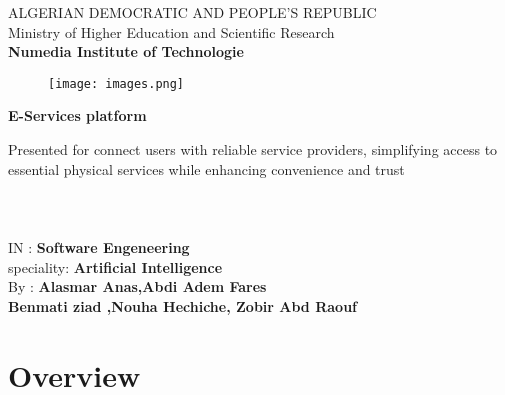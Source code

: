 \documentclass[12pt,a4paper]{report}
\begin{document}
\thispagestyle{empty}

\begin{center}
ALGERIAN DEMOCRATIC AND PEOPLE'S REPUBLIC\\ Ministry of Higher Education and Scientific Research\\
\textbf{Numedia Institute of Technologie}\\
\end{center}
\begin{figure}[H]
  \centering
  \texttt{[image: images.png]}
\end{figure}
\begin{center}
\begin{LARGE}
\textbf{E-Services platform}\\
\end{LARGE}
     
      
\begin{large}Presented for connect users with reliable service providers, simplifying access to essential physical services while enhancing convenience and trust\\
\textbf{                      }\\
\textbf{                      }\\
\textbf{                      }\\
IN : \textbf{Software Engeneering}\\
speciality: \textbf{Artificial Intelligence}\\
By : \textbf{Alasmar Anas,Abdi Adem Fares }\\
\textbf{Benmati ziad ,Nouha Hechiche, Zobir Abd Raouf}\\


\end{large}
\end{center}
\vfill

\setcounter{page}{0}
\newpage
{}

\newpage
\tableofcontents
\newpage

\chapter{Overview}
\end{document}
